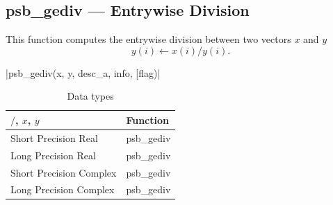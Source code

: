\clearpage\subsection{psb\_gediv --- Entrywise Division}

This function computes the entrywise division between two vectors $x$ and
$y$
\[y(i) \leftarrow x(i)/y(i).\]

\fortinline|psb_gediv(x, y, desc_a, info, [flag)|

\begin{table}[h]
	\begin{center}
		\begin{tabular}{ll}
			\hline
			$/$, $x$, $y$ & {\bf Function}\\
			\hline
			Short Precision Real & psb\_gediv \\
			Long Precision Real & psb\_gediv \\
			Short Precision Complex & psb\_gediv \\
			Long Precision Complex & psb\_gediv \\
			\hline
		\end{tabular}
	\end{center}
	\caption{Data types\label{tab:f90div}}
\end{table}

